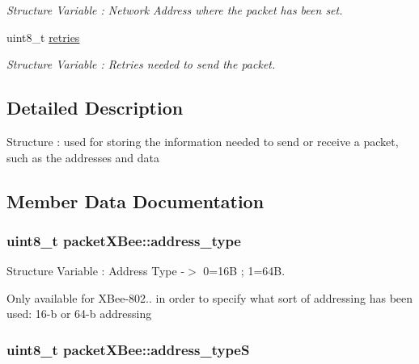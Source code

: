 \begin{DoxyCompactItemize}
\begin{DoxyCompactList}\small\item\em Structure Variable \+: Network Address where the packet has been set. \end{DoxyCompactList}\item 
uint8\+\_\+t \hyperlink{structpacket_x_bee_a8cfb13a635328f29c1c5905e5e2eee9c}{retries}\hypertarget{structpacket_x_bee_a8cfb13a635328f29c1c5905e5e2eee9c}{}\label{structpacket_x_bee_a8cfb13a635328f29c1c5905e5e2eee9c}

\begin{DoxyCompactList}\small\item\em Structure Variable \+: Retries needed to send the packet. \end{DoxyCompactList}\end{DoxyCompactItemize}


\subsection{Detailed Description}
Structure \+: used for storing the information needed to send or receive a packet, such as the addresses and data 

\subsection{Member Data Documentation}
\subsubsection[{\texorpdfstring{address\+\_\+type}{address_type}}]{\setlength{\rightskip}{0pt plus 5cm}uint8\+\_\+t packet\+X\+Bee\+::address\+\_\+type}\hypertarget{structpacket_x_bee_a8046b3e055fdda7a0c0c65dfda5bfbed}{}\label{structpacket_x_bee_a8046b3e055fdda7a0c0c65dfda5bfbed}


Structure Variable \+: Address Type -\/$>$ 0=16B ; 1=64B. 

Only available for X\+Bee-\/802.. in order to specify what sort of addressing has been used\+: 16-\/b or 64-\/b addressing 
\subsubsection[{\texorpdfstring{address\+\_\+typeS}{address_typeS}}]{\setlength{\rightskip}{0pt plus 5cm}uint8\+\_\+t packet\+X\+Bee\+::address\+\_\+typeS}\hypertarget{structpacket_x_bee_a8d484ac1477b21e6b901802ea3516a3a}{}\label{structpacket_x_bee_a8d484ac1477b21e6b901802ea3516a3a}


